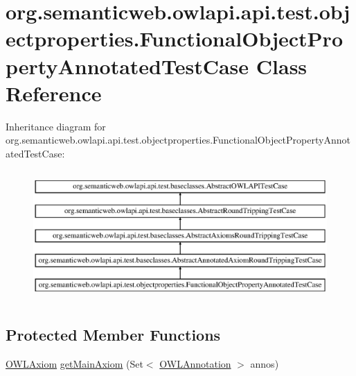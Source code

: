 \hypertarget{classorg_1_1semanticweb_1_1owlapi_1_1api_1_1test_1_1objectproperties_1_1_functional_object_property_annotated_test_case}{\section{org.\-semanticweb.\-owlapi.\-api.\-test.\-objectproperties.\-Functional\-Object\-Property\-Annotated\-Test\-Case Class Reference}
\label{classorg_1_1semanticweb_1_1owlapi_1_1api_1_1test_1_1objectproperties_1_1_functional_object_property_annotated_test_case}
}
Inheritance diagram for org.\-semanticweb.\-owlapi.\-api.\-test.\-objectproperties.\-Functional\-Object\-Property\-Annotated\-Test\-Case\-:\begin{figure}[H]
\begin{center}
\leavevmode
\includegraphics[height=5.000000cm]{classorg_1_1semanticweb_1_1owlapi_1_1api_1_1test_1_1objectproperties_1_1_functional_object_property_annotated_test_case}
\end{center}
\end{figure}
\subsection*{Protected Member Functions}
\begin{DoxyCompactItemize}
\item 
\hyperlink{interfaceorg_1_1semanticweb_1_1owlapi_1_1model_1_1_o_w_l_axiom}{O\-W\-L\-Axiom} \hyperlink{classorg_1_1semanticweb_1_1owlapi_1_1api_1_1test_1_1objectproperties_1_1_functional_object_property_annotated_test_case_a82709026b4b9e678eaa88bba1c78e319}{get\-Main\-Axiom} (Set$<$ \hyperlink{interfaceorg_1_1semanticweb_1_1owlapi_1_1model_1_1_o_w_l_annotation}{O\-W\-L\-Annotation} $>$ annos)
\end{DoxyCompactItemize}
